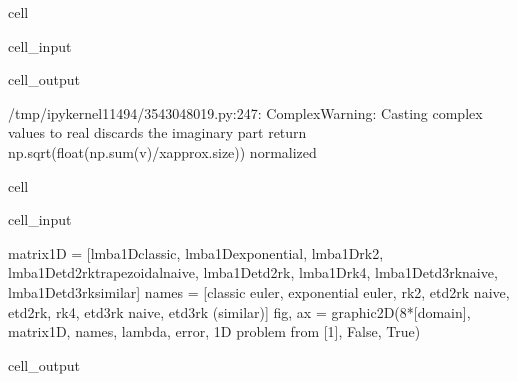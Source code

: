 \documentclass[letterpaper,10pt,english]{jupyterBook}
\begin{document}
\begin{sphinxuseclass}{cell}
\begin{sphinxVerbatimInput}
\begin{sphinxuseclass}{cell_input}
\end{sphinxuseclass}\end{sphinxVerbatimInput}
\begin{sphinxVerbatimOutput}

\begin{sphinxuseclass}{cell_output}
\begin{sphinxVerbatim}[commandchars=\\\{\}]
/tmp/ipykernel\PYGZus{}11494/3543048019.py:247: ComplexWarning: Casting complex values to real discards the imaginary part
  return np.sqrt(float(np.sum(v)/x\PYGZus{}approx.size)) \PYGZsh{}normalized
\end{sphinxVerbatim}

\end{sphinxuseclass}\end{sphinxVerbatimOutput}

\end{sphinxuseclass}
\begin{sphinxuseclass}{cell}\begin{sphinxVerbatimInput}

\begin{sphinxuseclass}{cell_input}
\begin{sphinxVerbatim}[commandchars=\\\{\}]
matrix\PYGZus{}1D = [lmba\PYGZus{}1D\PYGZus{}classic, lmba\PYGZus{}1D\PYGZus{}exponential, lmba\PYGZus{}1D\PYGZus{}rk2, lmba\PYGZus{}1D\PYGZus{}etd2rk\PYGZus{}trapezoidal\PYGZus{}naive, lmba\PYGZus{}1D\PYGZus{}etd2rk, lmba\PYGZus{}1D\PYGZus{}rk4, lmba\PYGZus{}1D\PYGZus{}etd3rk\PYGZus{}naive, lmba\PYGZus{}1D\PYGZus{}etd3rk\PYGZus{}similar]
names = [\PYGZsq{}classic euler\PYGZsq{}, \PYGZsq{}exponential euler\PYGZsq{}, \PYGZsq{}rk2\PYGZsq{}, \PYGZsq{}etd2rk naive\PYGZsq{}, \PYGZsq{}etd2rk\PYGZsq{}, \PYGZsq{}rk4\PYGZsq{}, \PYGZsq{}etd3rk naive\PYGZsq{}, \PYGZdq{}etd3rk (similar)\PYGZdq{}]
fig, ax = graphic\PYGZus{}2D(8*[domain], matrix\PYGZus{}1D, names, \PYGZdq{}lambda\PYGZdq{}, \PYGZdq{}error\PYGZdq{}, \PYGZdq{}1D problem from [1]\PYGZdq{}, False, True)
\end{sphinxVerbatim}

\end{sphinxuseclass}\end{sphinxVerbatimInput}
\begin{sphinxVerbatimOutput}

\begin{sphinxuseclass}{cell_output}
\noindent{}

\end{sphinxuseclass}\end{sphinxVerbatimOutput}

\end{sphinxuseclass}
\end{document}
